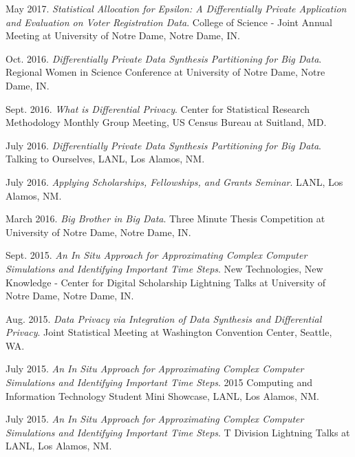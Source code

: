 \begin{etaremune}[topsep=0pt, itemsep=4pt, partopsep=0pt, parsep=0pt]
    \item May 2017. \textit{Statistical Allocation for Epsilon: A Differentially Private Application and Evaluation on Voter Registration Data}. College of Science - Joint Annual Meeting at University of Notre Dame, Notre Dame, IN.
    
    \item Oct. 2016. \textit{Differentially Private Data Synthesis Partitioning for Big Data}. Regional Women in Science Conference at University of Notre Dame, Notre Dame, IN. 
    
    \item Sept. 2016. \textit{What is Differential Privacy}. Center for Statistical Research Methodology Monthly Group Meeting, US Census Bureau at Suitland, MD. 
    
    \item July 2016. \textit{Differentially Private Data Synthesis Partitioning for Big Data}. Talking to Ourselves, LANL, Los Alamos, NM.
    
    \item July 2016. \textit{Applying Scholarships, Fellowships, and Grants Seminar}. LANL, Los Alamos, NM.
    
    \item March 2016. \textit{Big Brother in Big Data}. Three Minute Thesis Competition at University of Notre Dame, Notre Dame, IN.
    
    \item Sept. 2015. \textit{An In Situ Approach for Approximating Complex Computer Simulations and Identifying Important Time Steps}. New Technologies, New Knowledge - Center for Digital Scholarship Lightning Talks at University of Notre Dame, Notre Dame, IN.
    
    \item Aug. 2015. \textit{Data Privacy via Integration of Data Synthesis and Differential Privacy}. Joint Statistical Meeting at Washington Convention Center, Seattle, WA.
    
    \item July 2015. \textit{An In Situ Approach for Approximating Complex Computer Simulations and Identifying Important Time Steps}. 2015 Computing and Information Technology Student Mini Showcase, LANL, Los Alamos, NM.
    
    \item July 2015. \textit{An In Situ Approach for Approximating Complex Computer Simulations and Identifying Important Time Steps}. T Division Lightning Talks at LANL, Los Alamos, NM.
    

\end{etaremune}
